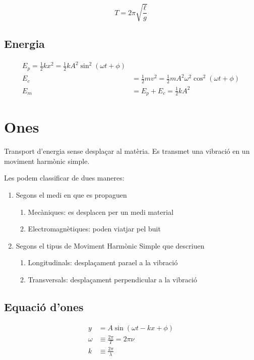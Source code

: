 \begin{equation}
    T=2\pi\sqrt{\frac{\ell}{g}}
\end{equation}

\subsection{Energia}
\label{sub:energia}

\begin{align}
    E_p = \frac{1}{2}kx^2 = \frac{1}{2}kA^2\sin^2\left(\omega t + \phi\right) \\
    E_c &= \frac{1}{2}mv^2 = \frac{1}{2}mA^2\omega^2\cos^2\left(\omega t + \phi\right) \\
    E_m &= E_p + E_c = \frac{1}{2}kA^2
\end{align}

\section{Ones}
\label{sec:ones}

Transport d'energia sense desplaçar al matèria. Es transmet una vibració en un
moviment harmònic simple.

Les podem classificar de dues maneres:
\begin{enumerate}
\item Segons el medi en que es propaguen
    \begin{enumerate}
        \item Mecàniques: es desplacen per un medi material
        \item Electromagnètiques: poden viatjar pel buit
    \end{enumerate}
\item Segons el tipus de Moviment Harmònic Simple que descriuen
    \begin{enumerate}
        \item Longitudinals: desplaçament para\lgem el a la vibració
        \item Transversals: desplaçament perpendicular a la vibració
    \end{enumerate}
\end{enumerate}

\subsection{Equació d'ones}
\label{sub:equacio_d_ones}

\begin{align}
    y &= A \sin \left( \omega t - k x + \phi \right)\\
    \omega &\equiv \frac{2\pi}{T} = 2\pi \nu \\
    k &\equiv \frac{2\pi}{\lambda}
\end{align}

